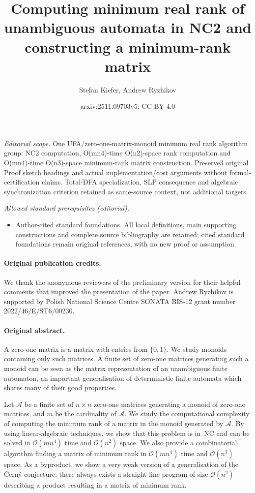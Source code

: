 \documentclass[11pt,a4paper]{amsart}
\title{Computing minimum real rank of unambiguous automata in NC2 and constructing a minimum-rank matrix}
\author{Stefan Kiefer, Andrew Ryzhikov}
\date{arxiv:2511.09703v5; CC BY 4.0}
\newcommand{\OO}{\mathcal{O}}
\newcommand{\Aa}{\mathcal{A}}
\newcommand{\NC}{\textnormal{\textsf{NC}}\xspace}
\theoremstyle{plain}
\theoremstyle{definition}
\theoremstyle{defC}
\theoremstyle{thmC}
\theoremstyle{plain}
\numberwithin{equation}{section}
\begin{document}
\maketitle
\noindent\textit{Editorial scope.} One UFA/zero-one-matrix-monoid minimum real rank algorithm group: NC2 computation, O(mn4)-time O(n2)-space rank computation and O(mn4)-time O(n3)-space minimum-rank matrix construction. Preserve3 original Proof sketch headings and actual implementation/cost arguments without formal-certification claims. Total-DFA specialization, SLP consequence and algebraic synchronization criterion retained as same-source context, not additional targets.\par\medskip
\noindent\textit{Allowed standard prerequisites (editorial).}\begin{itemize}
\item Author-cited standard foundations. All local definitions, main supporting constructions and complete source bibliography are retained; cited standard foundations remain original references, with no new proof or assumption.
\end{itemize}\medskip
\paragraph{Original publication credits.} We thank the anonymous reviewers of the preliminary version for their helpful comments that improved the presentation of the paper. Andrew Ryzhikov is supported by Polish National Science Centre SONATA BIS-12 grant
number 2022/46/E/ST6/00230.
\paragraph{Original abstract.} 
A zero-one matrix is a matrix with entries from $\{0, 1\}$. We study monoids containing only such matrices. A finite set of zero-one matrices generating such a monoid can be seen as the matrix representation of an unambiguous finite automaton, an important generalisation of deterministic finite automata which shares many of their good properties.

Let $\Aa$ be a finite set of $n \times n$ zero-one matrices generating a monoid of zero-one matrices, and $m$ be the cardinality of $\Aa$.
We study the computational complexity of computing the minimum rank of a matrix in the monoid generated by $\Aa$. By using linear-algebraic techniques, we show that this problem is in~\NC and can be solved in $\OO(mn^4)$ time and $\OO(n^2)$ space. We also provide a combinatorial algorithm finding a matrix of minimum rank in $\OO(mn^4)$ time and $\OO(n^3)$ space. As a byproduct, we show a very weak version of a generalisation of the \v{C}ern\'{y} conjecture: there always exists a straight line program of size $\OO(n^2)$ describing a product resulting in a matrix of minimum rank.
\end{document}
